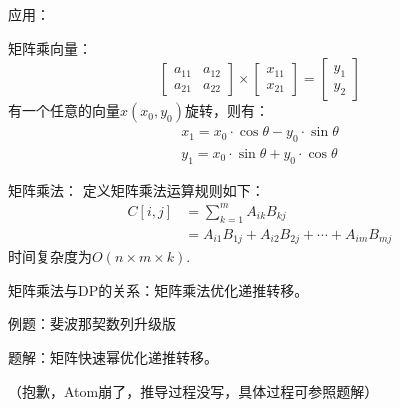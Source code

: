 应用：

矩阵乘向量：
\begin{equation*}
    \begin{bmatrix}
        a_{11}&a_{12}\\
        a_{21}&a_{22}
    \end{bmatrix}
    \times
    \begin{bmatrix}
        x_{11}\\
        x_{21}
    \end{bmatrix}
    =
    \begin{bmatrix}
        y_1\\
        y_2
    \end{bmatrix}
\end{equation*}
有一个任意的向量$x(x_0,y_0)$旋转\theta\textdegree，则有：
\begin{equation*}
    \begin{aligned}
        x_1=x_0\cdot\cos\theta-y_0\cdot\sin\theta\\
        y_1=x_0\cdot\sin\theta+y_0\cdot\cos\theta
    \end{aligned}
\end{equation*}

矩阵乘法：
定义矩阵乘法运算规则如下：
\begin{equation*}
    \begin{aligned}
        C[i,j]&=\sum_{k=1}^m A_{ik}B_{kj}\\
        &=A_{i1}B_{1j}+A_{i2}B_{2j}+\cdots +A_{im}B_{mj}
    \end{aligned}
\end{equation*}
时间复杂度为$O(n\times m\times k)$.

矩阵乘法与DP的关系：矩阵乘法优化递推转移。

例题：斐波那契数列升级版

题解：矩阵快速幂优化递推转移。

（抱歉，Atom崩了，推导过程没写，具体过程可参照题解）
